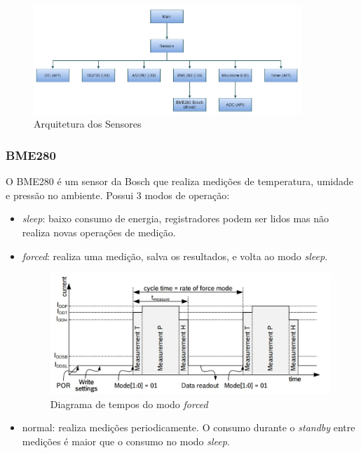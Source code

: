 \documentclass[../monografia.tex]{subfiles}
\begin{document}
\begin{figure}[h]
	\centering
	\includegraphics[width=0.9\textwidth]{sensors-arch}
	\caption{Arquitetura dos Sensores}
	\label{fig:sensors-arch}
\end{figure}

\subsubsection{BME280}

O BME280 é um sensor da Bosch que realiza medições de temperatura, umidade e pressão no ambiente. Possui 3 modos de operação: \cite{bme280}
\begin{itemize}
	\item \textit{sleep}: baixo consumo de energia, registradores podem ser lidos mas não realiza novas operações de medição.
	\item \textit{forced}: realiza uma medição, salva os resultados, e volta ao modo \textit{sleep}.
	
	\begin{figure}[h]
		\centering
		\includegraphics[width=12cm]{timing_bme280}
		\caption{Diagrama de tempos do modo \textit{forced}}
		\label{fig:time_bme280}
	\end{figure}

	\item normal: realiza medições periodicamente. O consumo durante o \textit{standby} entre medições é maior que o consumo no modo \textit{sleep}. 
\end{itemize}
\end{document}
